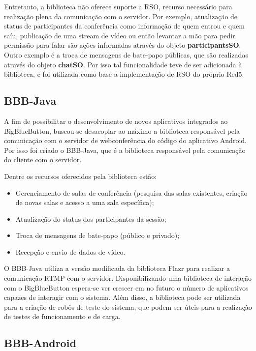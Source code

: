 \documentclass{acm_proc_article-sp}
\begin{document}
Entretanto, a biblioteca não oferece suporte a RSO, recurso necessário para realização plena da comunicação com o servidor. Por exemplo, atualização de status de participantes da conferência como informação de quem entrou e quem saíu, publicação de uma stream de vídeo ou então levantar a mão para pedir permissão para falar são ações informadas através do objeto \textbf{participantsSO}. Outro exemplo é a troca de mensagens de bate-papo públicas, que são realizadas através do objeto \textbf{chatSO}. Por isso tal funcionalidade teve de ser adicionada à biblioteca, e foi utilizada como base a implementação de RSO do próprio Red5.

\subsection{BBB-Java}

A fim de possibilitar o desenvolvimento de novos aplicativos integrados ao BigBlueButton, buscou-se desacoplar ao máximo a biblioteca responsável pela comunicação com o servidor de webconferência do código do aplicativo Android. Por isso foi criado o BBB-Java, que é a biblioteca responsável pela comunicação do cliente com o servidor.

Dentre os recursos oferecidos pela biblioteca estão:
\begin{itemize}
 \item Gerenciamento de salas de conferência (pesquisa das salas existentes, criação de novas salas e acesso a uma sala específica);
 \item Atualização do status dos participantes da sessão;
 \item Troca de mensagens de bate-papo (público e privado);
 \item Recepção e envio de dados de vídeo.
\end{itemize}

O BBB-Java utiliza a versão modificada da biblioteca Flazr para realizar a comunicação RTMP com o servidor. Disponibilizando uma biblioteca de interação com o BigBlueButton espera-se ver crescer em no futuro o número de aplicativos capazes de interagir com o sistema. Além disso, a biblioteca pode ser utilizada para a criação de robôs de teste do sistema, que podem ser úteis para a realização de testes de funcionamento e de carga.

\subsection{BBB-Android}
\end{document}
